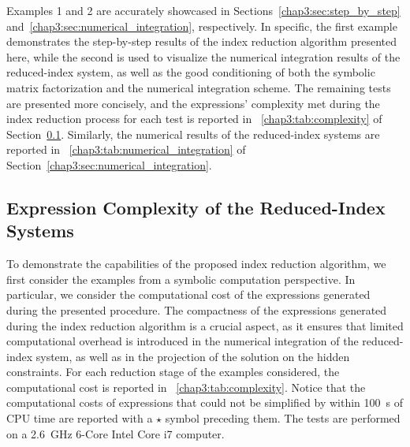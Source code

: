 %
Examples 1 and 2 are accurately showcased in Sections~\ref{chap3:sec:step_by_step} and~\ref{chap3:sec:numerical_integration}, respectively. In specific, the first example demonstrates the step-by-step results of the index reduction algorithm presented here, while the second is used to visualize the numerical integration results of the reduced-index system, as well as the good conditioning of both the symbolic matrix factorization and the numerical integration scheme. The remaining tests are presented more concisely, and the expressions' complexity met during the index reduction process for each test is reported in \tablename{}~\ref{chap3:tab:complexity} of Section~\ref{chap3:sec:daes_complexity}. Similarly, the numerical results of the reduced-index systems are reported in \tablename{}~\ref{chap3:tab:numerical_integration} of Section~\ref{chap3:sec:numerical_integration}.

\subsection{Expression Complexity of the Reduced-Index Systems}
\label{chap3:sec:daes_complexity}

To demonstrate the capabilities of the proposed index reduction algorithm, we first consider the examples from a symbolic computation perspective. In particular, we consider the computational cost of the expressions generated during the presented procedure. The compactness of the expressions generated during the index reduction algorithm is a crucial aspect, as it ensures that limited computational overhead is introduced in the numerical integration of the reduced-index system, as well as in the projection of the solution on the hidden constraints. For each reduction stage of the examples considered, the computational cost is reported in \tablename{}~\ref{chap3:tab:complexity}. Notice that the computational costs of expressions that could not be simplified by \Maple{} within \SI{100}{\second} of CPU time are reported with a $\star$ symbol preceding them. The tests are performed on a \SI{2.6}{\giga\hertz} 6-Core Intel\textsuperscript{\textregistered} Core\textsuperscript{\textregistered} i7 computer.

